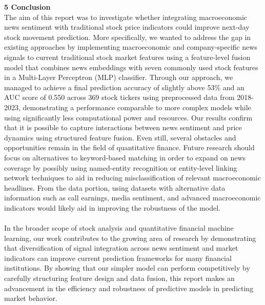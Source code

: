 \documentclass[letterpaper,12pt, twocolumn]{report}
\begin{document}
\large 
\noindent
\textbf{5 Conclusion} \\
\normalsize
The aim of this report was to investigate whether integrating macroeconomic news sentiment with traditional stock price indicators could improve next-day stock movement prediction. More specifically, we wanted to address the gap in existing approaches by implementing macroeconomic and company-specific news signals to current traditional stock market features using a feature-level fusion model that combines news embeddings with seven commonly used stock features in a Multi-Layer Perceptron (MLP) classifier. Through our approach, we managed to achieve a final prediction accuracy of slightly above 53\% and an AUC score of 0.550 across 369 stock tickers using preprocessed data from 2018-2023, demonstrating a performance comparable to more complex models while using significantly less computational power and resources. Our results confirm that it is possible to capture interactions between news sentiment and price dynamics using structured feature fusion. Even still, several obstacles and opportunities remain in the field of quantitative finance. Future research should focus on alternatives to keyword-based matching in order to expand on news coverage by possibly using named-entity recognition or entity-level linking network techniques to aid in reducing misclassification of relevant macroeconomic headlines. From the data portion, using datasets with alternative data information such as call earnings, media sentiment, and advanced macroeconomic indicators would likely aid in improving the robustness of the model. \\\\
In the broader scope of stock analysis and quantitative financial machine learning, our work contributes to the growing area of research by demonstrating that diversification of signal integration across news sentiment and market indicators can improve current prediction frameworks for many financial institutions. By showing that our simpler model can perform competitively by carefully structuring feature design and data fusion, this report makes an advancement in the efficiency and robustness of predictive models in predicting market behavior. 
\end{document}
